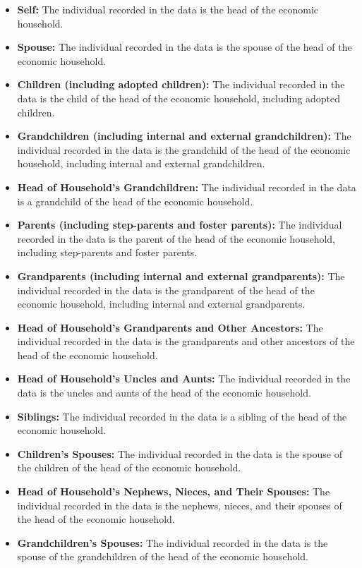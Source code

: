 \documentclass[twocolumn]{article}
\begin{document}
\begin{itemize}
    \item \textbf{Self:} The individual recorded in the data is the head of the economic household.
    \item \textbf{Spouse:} The individual recorded in the data is the spouse of the head of the economic household.
    \item \textbf{Children (including adopted children):} The individual recorded in the data is the child of the head of the economic household, including adopted children.
    \item \textbf{Grandchildren (including internal and external grandchildren):} The individual recorded in the data is the grandchild of the head of the economic household, including internal and external grandchildren.
    \item \textbf{Head of Household's Grandchildren:} The individual recorded in the data is a grandchild of the head of the economic household.
    \item \textbf{Parents (including step-parents and foster parents):} The individual recorded in the data is the parent of the head of the economic household, including step-parents and foster parents.
    \item \textbf{Grandparents (including internal and external grandparents):} The individual recorded in the data is the grandparent of the head of the economic household, including internal and external grandparents.
    \item \textbf{Head of Household's Grandparents and Other Ancestors:} The individual recorded in the data is the grandparents and other ancestors of the head of the economic household.
    \item \textbf{Head of Household's Uncles and Aunts:} The individual recorded in the data is the uncles and aunts of the head of the economic household.
    \item \textbf{Siblings:} The individual recorded in the data is a sibling of the head of the economic household.
    \item \textbf{Children's Spouses:} The individual recorded in the data is the spouse of the children of the head of the economic household.
    \item \textbf{Head of Household's Nephews, Nieces, and Their Spouses:} The individual recorded in the data is the nephews, nieces, and their spouses of the head of the economic household.
    \item \textbf{Grandchildren's Spouses:} The individual recorded in the data is the spouse of the grandchildren of the head of the economic household.

\end{itemize}
\end{document}
